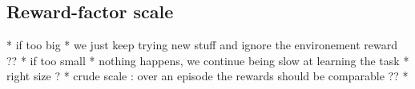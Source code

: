 \documentclass[a4paper, 12pt,oneside]{article}
\begin{document}
            \subsection{Reward-factor scale}
            * if too big
            * we just keep trying new stuff and ignore the environement reward ??  
            * if too small
            * nothing happens, we continue being slow at learning the task
            * right size ?
            * crude scale : over an episode the rewards should be comparable ?? 
            * 
\end{document}
